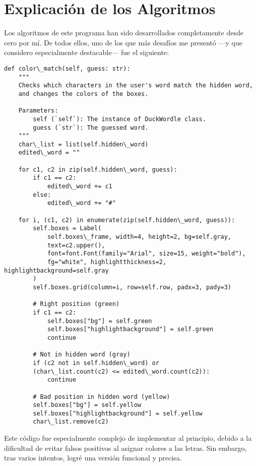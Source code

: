 \section{Explicación de los Algoritmos}

\noindent Los algoritmos de este programa han sido desarrollados completamente desde cero por mí. De todos ellos, uno de los que más desafíos me presentó —y que considero especialmente destacable— fue el siguiente:

\begin{lstlisting}
def color\_match(self, guess: str):
    """
    Checks which characters in the user's word match the hidden word,
    and changes the colors of the boxes.

    Parameters:
        self (`self`): The instance of DuckWordle class.
        guess (`str`): The guessed word.
    """
    char\_list = list(self.hidden\_word)
    edited\_word = ""
    
    for c1, c2 in zip(self.hidden\_word, guess):
        if c1 == c2:
            edited\_word += c1
        else:
            edited\_word += "#"

    for i, (c1, c2) in enumerate(zip(self.hidden\_word, guess)):
        self.boxes = Label(
            self.boxes\_frame, width=4, height=2, bg=self.gray,
            text=c2.upper(),
            font=font.Font(family="Arial", size=15, weight="bold"),
            fg="white", highlightthickness=2, highlightbackground=self.gray
        )
        self.boxes.grid(column=i, row=self.row, padx=3, pady=3)
        
        # Right position (green)
        if c1 == c2:
            self.boxes["bg"] = self.green
            self.boxes["highlightbackground"] = self.green
            continue

        # Not in hidden word (gray)
        if (c2 not in self.hidden\_word) or
        (char\_list.count(c2) <= edited\_word.count(c2)):
            continue

        # Bad position in hidden word (yellow)
        self.boxes["bg"] = self.yellow
        self.boxes["highlightbackground"] = self.yellow
        char\_list.remove(c2)
\end{lstlisting}

\noindent Este código fue especialmente complejo de implementar al principio, debido a la dificultad de evitar falsos positivos al asignar colores a las letras. Sin embargo, tras varios intentos, logré una versión funcional y precisa.

\bigskip


